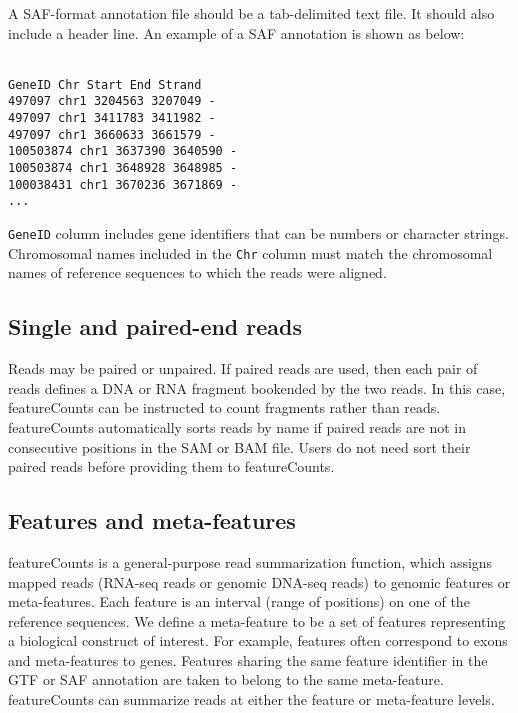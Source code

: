 \documentclass[12pt]{report}
\newcommand{\code}[1]{{\small\texttt{#1}}}
\newcommand{\featureCounts}{\textsf{featureCounts}}
\begin{document}
A SAF-format annotation file should be a tab-delimited text file.
It should also include a header line.
An example of a SAF annotation is shown as below:

\code{\\
GeneID	Chr	Start	End	Strand\\
497097	chr1	3204563	3207049	-\\
497097	chr1	3411783	3411982	-\\
497097	chr1	3660633	3661579	-\\
100503874	chr1	3637390	3640590	-\\
100503874	chr1	3648928	3648985	-\\
100038431	chr1	3670236	3671869	-\\
...
}

\code{GeneID} column includes gene identifiers that can be numbers or character strings.
Chromosomal names included in the \code{Chr} column must match the chromosomal names of reference sequences to which the reads were aligned.

\subsection{Single and paired-end reads}

Reads may be paired or unpaired.
If paired reads are used, then each pair of reads defines a DNA or RNA fragment bookended by the two reads.
In this case, {\featureCounts} can be instructed to count fragments rather than reads.
{\featureCounts} automatically sorts reads by name if paired reads are not in consecutive positions in the SAM or BAM file.
Users do not need sort their paired reads before providing them to {\featureCounts}.

\subsection{Features and meta-features}

{\featureCounts} is a general-purpose read summarization function, which assigns mapped reads (RNA-seq reads or genomic DNA-seq reads) to genomic features or meta-features.
Each feature is an interval (range of positions) on one of the reference sequences. We define a meta-feature to be a set of features representing a biological construct of interest. For example, features often correspond to exons and meta-features to genes. Features sharing the same feature identifier in the GTF or SAF annotation are taken to belong to the same meta-feature. {\featureCounts} can summarize reads at either the feature or meta-feature levels.
\end{document}
